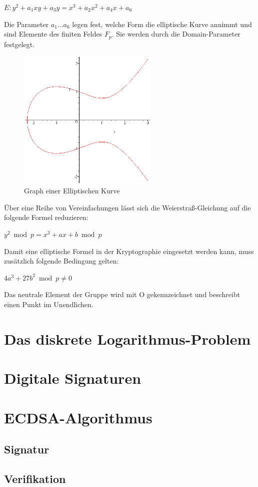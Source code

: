 \begin{center}
$E: y^2 + a_1 x y + a_3 y = x^3 + a_2 x^2 + a_4 x + a_6 $
\end{center}

Die Parameter $a_1 \dots a_6$ legen fest, welche Form die elliptische Kurve annimmt und sind Elemente des finiten Feldes $F_p$. Sie werden durch die Domain-Parameter festgelegt. 

\begin{figure}[H]
	\centering
   \includegraphics[width=0.60\textwidth]{bilder/ellkurve}
	\caption{Graph einer Elliptischen Kurve}
	\label{ellkurve}
\end{figure}

Über eine Reihe von Vereinfachungen lässt sich die Weierstraß-Gleichung auf die folgende Formel reduzieren:  %
\begin{center}
$ y^2 \bmod p = x^3 + a x + b \bmod p $
\end{center}


Damit eine elliptische Formel in der Kryptographie eingesetzt werden kann, muss zusätzlich folgende Bedingung gelten: %
\begin{center}
$ 4 a^3 + 27 b^2 \bmod p \ne 0 $
\end{center}

Das neutrale Element der Gruppe wird mit O gekennzeichnet und beschreibt einen Punkt im Unendlichen. \\


\section{Das diskrete Logarithmus-Problem}


\section{Digitale Signaturen}


\section{ECDSA-Algorithmus}

\subsection{Signatur}

\subsection{Verifikation}

